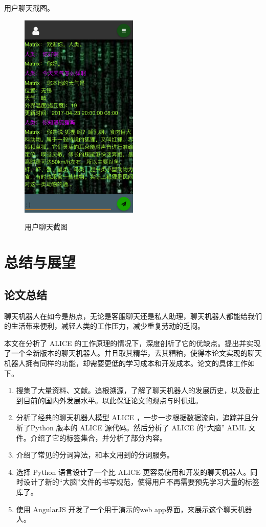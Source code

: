 \documentclass[bachelor,winfonts]{jnuthesis}
\begin{document}
用户聊天截图。

\begin{figure}[H]
  \centering
  \includegraphics[width= 0.5\textwidth]{chat4.png}\\
  \caption{用户聊天截图}\label{fig:pic4}
\end{figure}


\chapter{总结与展望}
\section{论文总结}

聊天机器人在如今是热点，无论是客服聊天还是私人助理，聊天机器人都能给我们的生活带来便利，减轻人类的工作压力，减少重复劳动的乏闷。

本文在分析了 ALICE 的工作原理的情况下，深度剖析了它的优缺点。提出并实现了一个全新版本的聊天机器人。并且取其精华，去其糟粕，使得本论文实现的聊天机器人拥有同样的功能，却需要更低的学习成本和开发成本。论文的具体工作如下。

\begin{enumerate}
\item 搜集了大量资料、文献。追根溯源，了解了聊天机器人的发展历史，以及截止到目前的国内外发展水平。以此保证论文的观点与时俱进。
\item 分析了经典的聊天机器人模型 ALICE ，一步一步根据数据流向，追踪并且分析了Python 版本的 ALICE 源代码。然后分析了 ALICE 的“大脑” AIML 文件。介绍了它的标签集合，并分析了部分内容。
\item 介绍了常见的分词算法，和本文用到的分词服务。
\item 选择 Python 语言设计了一个比 ALICE 更容易使用和开发的聊天机器人。同时设计了新的“大脑”文件的书写规范，使得用户不再需要预先学习大量的标签库了。
\item 使用 AngularJS 开发了一个用于演示的web app界面，来展示这个聊天机器人。
\end{enumerate}
\end{document}
